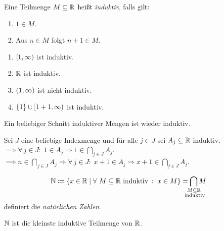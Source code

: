 \documentclass[../ana1.tex]{subfiles}
\begin{document}
\iftoggle{short}{}{\newpage}%

\begin{defi}
	Eine Teilmenge \(M \subseteq \mathbb{R} \) heißt \textit{induktiv}, falls gilt:
	\begin{enumerate}[label= (I \arabic*)]
		\item\label{ax:I1} \(1 \in M \).
		\item\label{ax:I2} Aus \(n \in M \) folgt \(n + 1 \in M \).
	\end{enumerate}
\end{defi}

\begin{bspe}\leavevmode
	\begin{enumerate}[(1)]
		\item \([1 , \infty) \) ist induktiv.
		\item \(\mathbb{R} \) ist induktiv.
		\item \((1 , \infty) \) ist nicht induktiv.
		\item \(\{1\} \cup [1+1 , \infty) \) ist induktiv.
	\end{enumerate}
\end{bspe}

\begin{bem}
	Ein beliebiger Schnitt induktiver Mengen ist wieder induktiv.
\end{bem}
\begin{bew}
	Sei \(J \) eine beliebige Indexmenge und für alle \(j \in J \) sei \(A_{j} \subseteq \mathbb{R} \) induktiv. \\
	\(\implies \forall \, j \in J \colon \; 1 \in A_{j} \Rightarrow 1 \in \underset{j \in J}{\bigcap}A_{j} \). \\
	\(\implies n \in \underset{j \in J}{\bigcap}A_{j} \Rightarrow \forall \, j \in J \colon \; x + 1 \in A_{j} \Rightarrow x + 1 \in \underset{j \in J}{\bigcap}A_{j} \).
\end{bew}

\begin{defi}
	\[\N \coloneqq \set{x \in \R  \; \vert  \; \forall \, M \subseteq \R \text{ induktiv } \colon \; x \in M} 
	= \smashoperator{\bigcap_{\substack{M \subseteq \R \\ \text{ induktiv}}}} M \]
	definiert die \textit{natürlichen Zahlen}.
\end{defi}

\begin{bem}
	\(\mathbb{N} \) ist die kleinste induktive Teilmenge von \(\mathbb{R} \).
\end{bem}
\end{document}
